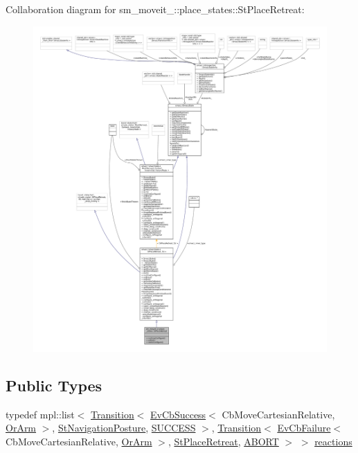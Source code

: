 Collaboration diagram for sm\+\_\+moveit\+\_\+:\+:place\+\_\+states\+:\+:St\+Place\+Retreat\+:
\nopagebreak
\begin{figure}[H]
\begin{center}
\leavevmode
\includegraphics[width=350pt]{structsm__moveit__4_1_1place__states_1_1StPlaceRetreat__coll__graph}
\end{center}
\end{figure}
\subsection*{Public Types}
\begin{DoxyCompactItemize}
\item 
typedef mpl\+::list$<$ \hyperlink{classsmacc_1_1Transition}{Transition}$<$ \hyperlink{structsmacc_1_1EvCbSuccess}{Ev\+Cb\+Success}$<$ Cb\+Move\+Cartesian\+Relative, \hyperlink{classsm__moveit__4_1_1OrArm}{Or\+Arm} $>$, \hyperlink{structsm__moveit__4_1_1place__states_1_1StNavigationPosture}{St\+Navigation\+Posture}, \hyperlink{structsmacc_1_1default__transition__tags_1_1SUCCESS}{S\+U\+C\+C\+E\+SS} $>$, \hyperlink{classsmacc_1_1Transition}{Transition}$<$ \hyperlink{structsmacc_1_1EvCbFailure}{Ev\+Cb\+Failure}$<$ Cb\+Move\+Cartesian\+Relative, \hyperlink{classsm__moveit__4_1_1OrArm}{Or\+Arm} $>$, \hyperlink{structsm__moveit__4_1_1place__states_1_1StPlaceRetreat}{St\+Place\+Retreat}, \hyperlink{structsmacc_1_1default__transition__tags_1_1ABORT}{A\+B\+O\+RT} $>$ $>$ \hyperlink{structsm__moveit__4_1_1place__states_1_1StPlaceRetreat_aa310f15b48b2227c80280277dd3b306e}{reactions}
\end{DoxyCompactItemize}
